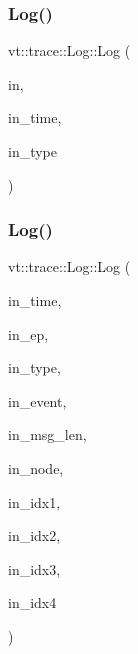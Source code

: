 \subsubsection{\texorpdfstring{Log()}{Log()}\hspace{0.1cm}{\footnotesize\ttfamily [9/11]}}
{\footnotesize\ttfamily vt\+::trace\+::\+Log\+::\+Log (\begin{DoxyParamCaption}\item[{\hyperlink{structvt_1_1trace_1_1_log}{Log} const \&}]{in,  }\item[{double}]{in\+\_\+time,  }\item[{\hyperlink{namespacevt_1_1trace_acf454dfbd581b0ebae895f90b5927a1d}{Trace\+Constants\+Type}}]{in\+\_\+type }\end{DoxyParamCaption})\hspace{0.3cm}{\ttfamily [inline]}}

\mbox{\label{structvt_1_1trace_1_1_log_ab48521fa03009ac8033116f7f06b195b}} 
\subsubsection{\texorpdfstring{Log()}{Log()}\hspace{0.1cm}{\footnotesize\ttfamily [10/11]}}
{\footnotesize\ttfamily vt\+::trace\+::\+Log\+::\+Log (\begin{DoxyParamCaption}\item[{double}]{in\+\_\+time,  }\item[{\hyperlink{namespacevt_1_1trace_a3c14050715ba9eceaeff51fb3de64f2f}{Trace\+Entry\+I\+D\+Type}}]{in\+\_\+ep,  }\item[{\hyperlink{namespacevt_1_1trace_acf454dfbd581b0ebae895f90b5927a1d}{Trace\+Constants\+Type}}]{in\+\_\+type,  }\item[{\hyperlink{namespacevt_1_1trace_a64a7185f3e102df8d8258f263ccd1582}{Trace\+Event\+I\+D\+Type}}]{in\+\_\+event,  }\item[{\hyperlink{namespacevt_1_1trace_aeb598f45d67d41db7902e494f2f0ce59}{Trace\+Msg\+Len\+Type}}]{in\+\_\+msg\+\_\+len,  }\item[{\hyperlink{namespacevt_a866da9d0efc19c0a1ce79e9e492f47e2}{Node\+Type}}]{in\+\_\+node,  }\item[{uint64\+\_\+t}]{in\+\_\+idx1,  }\item[{uint64\+\_\+t}]{in\+\_\+idx2,  }\item[{uint64\+\_\+t}]{in\+\_\+idx3,  }\item[{uint64\+\_\+t}]{in\+\_\+idx4 }\end{DoxyParamCaption})\hspace{0.3cm}{\ttfamily [inline]}}

